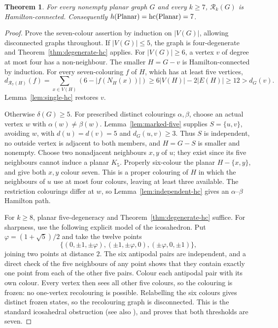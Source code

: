 \documentclass[11pt]{article}
\newtheorem{theorem}{Theorem}[section]
\theoremstyle{remark}
\newcommand{\R}{\mathcal R}
\newcommand{\Rk}{\mathcal R_k}
\newcommand{\hc}{\operatorname{hc}}
\numberwithin{equation}{section}
\numberwithin{table}{section}
\begin{document}
\begin{theorem}
\label{thm:planar-hc}
For every nonempty planar graph $G$ and every $k\ge7$, $\Rk(G)$ is
Hamilton-connected.  Consequently
$h(\textup{Planar})=\hc(\textup{Planar})=7$.
\end{theorem}

\begin{proof}
Prove the seven-colour assertion by induction on $|V(G)|$, allowing
disconnected graphs throughout.  If $|V(G)|\le5$, the graph is
four-degenerate and Theorem~\ref{thm:degenerate-hc} applies.
For $|V(G)|\ge6$, a vertex $v$ of degree at most four has a
non-neighbour.  The smaller $H=G-v$ is Hamilton-connected by induction.
For every seven-colouring $f$ of $H$, which has at least five vertices,
\[
 d_{\R_7(H)}(f)
 =\sum_{x\in V(H)}(6-|f(N_H(x))|)
 \ge6|V(H)|-2|E(H)|\ge12>d_G(v).
\]
Lemma~\ref{lem:single-hc} restores $v$.

Otherwise $\delta(G)\ge5$.  For prescribed distinct colourings
$\alpha,\beta$, choose an actual vertex $w$ with
$\alpha(w)\ne\beta(w)$.  Lemma~\ref{lem:marked-five} supplies
$S=\{u,v\}$, avoiding $w$, with $d(u)=d(v)=5$ and
$d_G(u,v)\ge3$.  Thus $S$ is independent, no outside vertex is
adjacent to both members, and $H=G-S$ is smaller and nonempty.
Choose two nonadjacent neighbours $x,y$ of $u$; they exist since its
five neighbours cannot induce a planar $K_5$.  Properly six-colour the
planar $H-\{x,y\}$, and give both $x,y$ colour seven.  This is a
proper colouring of $H$ in which the neighbours of $u$ use at most
four colours, leaving at least three available.  The restriction
colourings differ at $w$, so Lemma~\ref{lem:independent-hc} gives
an $\alpha$--$\beta$ Hamilton path.

For $k\ge8$, planar five-degeneracy and
Theorem~\ref{thm:degenerate-hc} suffice.  For sharpness, use the following
explicit model of the icosahedron.  Put $\varphi=(1+\sqrt5)/2$ and take the
twelve points
\[
 \{(0,\pm1,\pm\varphi),(\pm1,\pm\varphi,0),
          (\pm\varphi,0,\pm1)\},
\]
joining two points at distance $2$.  The six antipodal pairs are independent,
and a direct check of the five neighbours of any point shows that they contain
exactly one point from each of the other five pairs.  Colour each antipodal
pair with its own colour.  Every vertex then sees all other five colours, so
the colouring is frozen: no one-vertex recolouring is possible.  Relabelling
the six colours gives distinct frozen states, so the recolouring graph is
disconnected.  This is the standard icosahedral obstruction (see also
\cite{BP16}), and proves that both thresholds are seven.
\end{proof}
\end{document}
